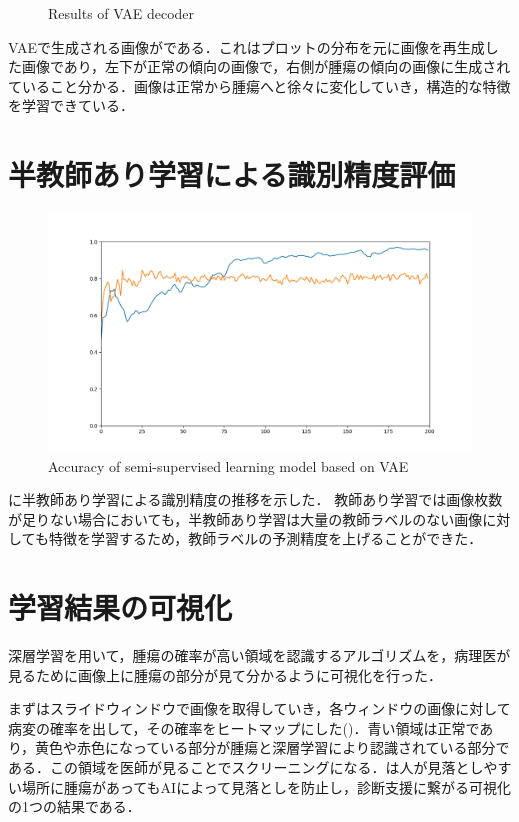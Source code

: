 \begin{figure}[H]
	\caption{Results of VAE decoder}
	\label{fig:resultsVAE}
	
\end{figure}


VAEで生成される画像がである．これはプロットの分布を元に画像を再生成した画像であり，左下が正常の傾向の画像で，右側が腫瘍の傾向の画像に生成されていること分かる．画像は正常から腫瘍へと徐々に変化していき，構造的な特徴を学習できている．


\section{半教師あり学習による識別精度評価}

\begin{figure}[H]
	\centering
	\includegraphics[width=0.8\linewidth]{fig/chapter4/accuracy_summary}
	\caption{Accuracy of semi-supervised learning model based on VAE}
	\label{fig:semiVAE_acc}
\end{figure}

に半教師あり学習による識別精度の推移を示した．
教師あり学習では画像枚数が足りない場合においても，半教師あり学習は大量の教師ラベルのない画像に対しても特徴を学習するため，教師ラベルの予測精度を上げることができた．


\section{学習結果の可視化}
深層学習を用いて，腫瘍の確率が高い領域を認識するアルゴリズムを，病理医が見るために画像上に腫瘍の部分が見て分かるように可視化を行った．

まずはスライドウィンドウで画像を取得していき，各ウィンドウの画像に対して病変の確率を出して，その確率をヒートマップにした()．青い領域は正常であり，黄色や赤色になっている部分が腫瘍と深層学習により認識されている部分である．この領域を医師が見ることでスクリーニングになる．は人が見落としやすい場所に腫瘍があってもAIによって見落としを防止し，診断支援に繋がる可視化の1つの結果である．

